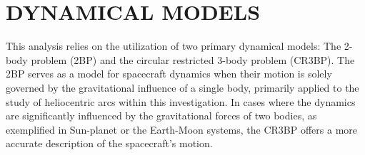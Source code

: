 \chapter{DYNAMICAL MODELS}

This analysis relies on the utilization of two primary dynamical models: The 2-body problem (2BP)
and the circular restricted 3-body problem (CR3BP). The 2BP serves as a model for spacecraft
dynamics when their motion is solely governed by the gravitational influence of a single body,
primarily applied to the study of heliocentric arcs within this investigation. In cases where the
dynamics are significantly influenced by the gravitational forces of two bodies, as exemplified in
Sun-planet or the Earth-Moon systems, the CR3BP offers a more accurate description of the
spacecraft's motion.







